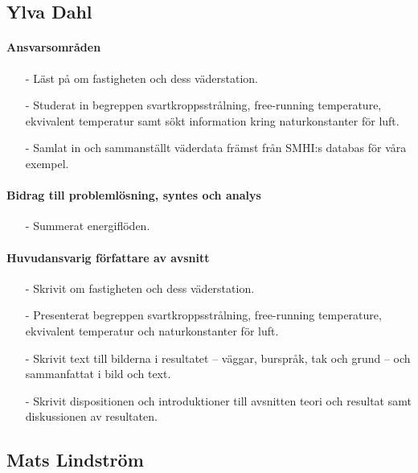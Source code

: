 \documentclass[12pt,a4paper]{article}
\begin{document}
\subsection*{Ylva Dahl}

\paragraph{Ansvarsområden}

\begin{itemize}
\item[-] Läst på om fastigheten och dess väderstation.
\item[-] Studerat in begreppen svartkroppsstrålning, free-running temperature, ekvivalent temperatur samt sökt information kring naturkonstanter för luft.
\item[-] Samlat in och sammanställt väderdata främst från SMHI:s databas för våra exempel.
\end{itemize}

\paragraph{Bidrag till problemlösning, syntes och analys}
\begin{itemize}
\item[-] Summerat energiflöden.
\end{itemize}

\paragraph{Huvudansvarig författare av avsnitt}
\begin{itemize}
\item[-] Skrivit om fastigheten och dess väderstation.
\item[-] Presenterat begreppen svartkroppsstrålning, free-running temperature, ekvivalent temperatur och naturkonstanter för luft.
\item[-] Skrivit text till bilderna i resultatet – väggar, burspråk, tak och grund – och sammanfattat i bild och text.
\item[-] Skrivit dispositionen och introduktioner till avsnitten teori och resultat samt diskussionen av resultaten.
\end{itemize}


\subsection*{Mats Lindström}
\end{document}
